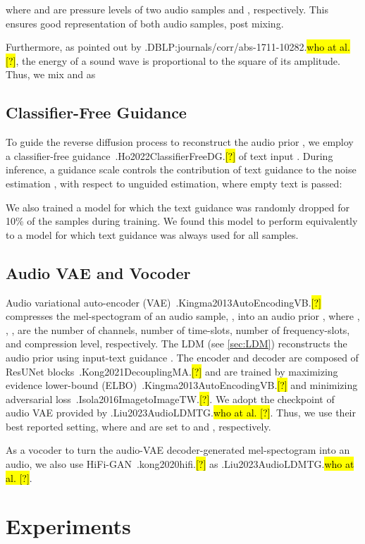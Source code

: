 \documentclass{article}
\let\realcite\cite
\renewcommand{\cite}[1]{\ifx.#1.\hl{[?]}\else\realcite{#1}\fi}
\let\realcitet\citet
\renewcommand{\citet}[1]{\ifx.#1.\hl{who at al. [?]}\else\realcitet{#1}\fi}
\begin{document}
where  and  are pressure levels of two audio samples  and , respectively. This ensures good representation of both audio samples, post mixing.

Furthermore, as pointed out by \citet{DBLP:journals/corr/abs-1711-10282}, the energy of a sound wave is proportional to the square of its amplitude. Thus, we mix  and  as



\subsection{Classifier-Free Guidance}

To guide the reverse diffusion process to reconstruct the audio prior , we employ a classifier-free guidance~\cite{Ho2022ClassifierFreeDG} of text input . During inference, a guidance scale  controls the contribution of text guidance to the noise estimation , with respect to unguided estimation, where empty text is passed:


We also trained a model for which the text guidance was randomly dropped for 10\% of the samples during training. We found this model to perform equivalently to a model for which text guidance was always used for all samples.

\subsection{Audio VAE and Vocoder}
\label{sec:VAE}

Audio variational auto-encoder (VAE)~\cite{Kingma2013AutoEncodingVB} compresses the mel-spectogram of an audio sample, , into an audio prior , where , , ,  are the number of channels, number of time-slots, number of frequency-slots, and compression level, respectively. The LDM (see \cref{sec:LDM}) reconstructs the audio prior  using input-text guidance . 
The encoder and decoder are composed of ResUNet blocks~\cite{Kong2021DecouplingMA} and are trained by maximizing evidence lower-bound (ELBO)~\cite{Kingma2013AutoEncodingVB} and minimizing adversarial loss~\cite{Isola2016ImagetoImageTW}.
We adopt the checkpoint of audio VAE provided by \citet{Liu2023AudioLDMTG}. Thus, we use their best reported setting, where  and  are set to  and , respectively.

As a vocoder to turn the audio-VAE decoder-generated mel-spectogram into an audio, we also use HiFi-GAN~\cite{kong2020hifi} as \citet{Liu2023AudioLDMTG}.


\section{Experiments}
\label{sec:experiments}
\end{document}
